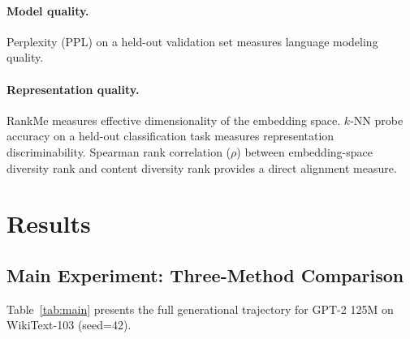 \documentclass[11pt,a4paper]{article}
\begin{document}
\paragraph{Model quality.}
Perplexity (PPL) on a held-out validation set measures language modeling quality.

\paragraph{Representation quality.}
RankMe \cite{garrido2023rankme} measures effective dimensionality of the embedding space.
$k$-NN probe accuracy on a held-out classification task measures representation discriminability.
Spearman rank correlation ($\rho$) between embedding-space diversity rank and content diversity rank provides a direct alignment measure.

\section{Results}

\subsection{Main Experiment: Three-Method Comparison}
\label{sec:main}

Table~\ref{tab:main} presents the full generational trajectory for GPT-2 125M on WikiText-103 (seed=42).
\end{document}
